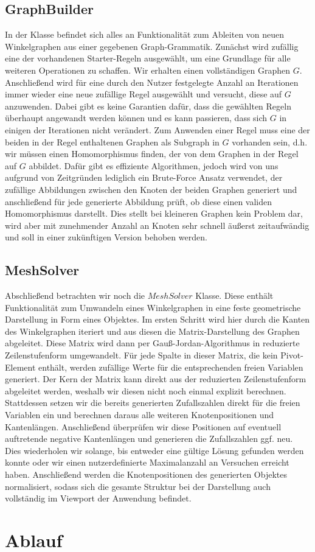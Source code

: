 \subsection{GraphBuilder}
In der  Klasse befindet sich alles an Funktionalität zum Ableiten von neuen Winkelgraphen aus einer gegebenen
Graph-Grammatik. Zunächst wird zufällig eine der vorhandenen Starter-Regeln ausgewählt, um eine Grundlage für alle weiteren Operationen
zu schaffen. Wir erhalten einen vollständigen Graphen \(G\). Anschließend wird für eine durch den Nutzer festgelegte Anzahl an
Iterationen immer wieder eine neue zufällige Regel ausgewählt und versucht, diese auf \(G\) anzuwenden. Dabei gibt es keine Garantien
dafür, dass die gewählten Regeln überhaupt angewandt werden können und es kann passieren, dass sich \(G\) in einigen der Iterationen
nicht verändert. Zum Anwenden einer Regel muss eine der beiden in der Regel enthaltenen Graphen als Subgraph in \(G\) vorhanden sein,
d.h. wir müssen einen Homomorphismus finden, der von dem Graphen in der Regel auf \(G\) abbildet. Dafür gibt es effiziente Algorithmen,
jedoch wird von uns aufgrund von Zeitgründen lediglich ein Brute-Force Ansatz verwendet, der zufällige Abbildungen zwischen den Knoten
der beiden Graphen generiert und anschließend für jede generierte Abbildung prüft, ob diese einen validen Homomorphismus darstellt.
Dies stellt bei kleineren Graphen kein Problem dar, wird aber mit zunehmender Anzahl an Knoten sehr schnell äußerst zeitaufwändig und
soll in einer zukünftigen Version behoben werden.

\subsection{MeshSolver}
Abschließend betrachten wir noch die \(MeshSolver\) Klasse. Diese enthält Funktionalität zum Umwandeln eines Winkelgraphen in eine
feste geometrische Darstellung in Form eines  Objektes. Im ersten Schritt wird hier durch die Kanten des
Winkelgraphen iteriert und aus diesen die Matrix-Darstellung des Graphen abgeleitet. Diese Matrix wird dann per Gauß-Jordan-Algorithmus
in reduzierte Zeilenstufenform umgewandelt. Für jede Spalte in dieser Matrix, die kein Pivot-Element enthält, werden zufällige
Werte für die entsprechenden freien Variablen generiert. Der Kern der Matrix kann direkt aus der reduzierten Zeilenstufenform
abgeleitet werden, weshalb wir diesen nicht noch einmal explizit berechnen. Stattdessen setzen wir die bereits generierten Zufallszahlen
direkt für die freien Variablen ein und berechnen daraus alle weiteren Knotenpositionen und Kantenlängen. Anschließend überprüfen wir
diese Positionen auf eventuell auftretende negative Kantenlängen und generieren die Zufallszahlen ggf. neu. Dies wiederholen wir solange,
bis entweder eine gültige Lösung gefunden werden konnte oder wir einen nutzerdefinierte Maximalanzahl an Versuchen erreicht haben.
Anschließend werden die Knotenpositionen des generierten  Objektes normalisiert, sodass sich die gesamte Struktur
bei der Darstellung auch vollständig im Viewport der Anwendung befindet.

\section{Ablauf}
